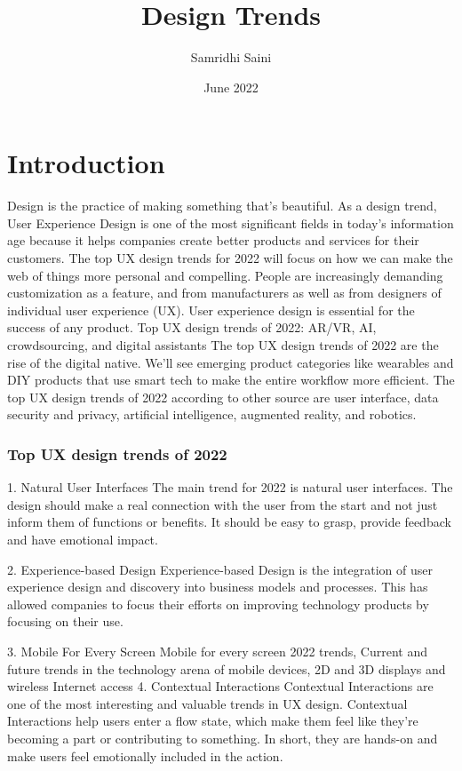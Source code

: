 \documentclass{article}
\title{Design Trends}
\author{Samridhi Saini}
\date{June 2022}
\begin{document}
\maketitle

\section{Introduction}
 Design is the practice of making something that’s beautiful. As a design trend, User Experience Design is one of the most significant fields in today’s information age because it helps companies create better products and services for their customers.
The top UX design trends for 2022 will focus on how we can make the web of things more personal and compelling. People are increasingly demanding customization as a feature, and from manufacturers as well as from designers of individual user experience (UX).
User experience design is essential for the success of any product. Top UX design trends of 2022: AR/VR, AI, crowdsourcing, and digital assistants
The top UX design trends of 2022 are the rise of the digital native. We'll see emerging product categories like wearables and DIY products that use smart tech to make the entire workflow more efficient. The top UX design trends of 2022 according to other source  are user interface, data security and privacy, artificial intelligence, augmented reality, and robotics.

\subsubsection{Top UX design trends of 2022}
1. Natural User Interfaces 
 The main trend for 2022 is natural user interfaces. The design should make a real connection with the user from the start and not just inform them of functions or benefits. It should be easy to grasp, provide feedback and have emotional impact.

2. Experience-based Design
 Experience-based Design is the integration of user experience design and discovery into business models and processes. This has allowed companies to focus their efforts on improving technology products by focusing on their use. 
 
3. Mobile For Every Screen 
 Mobile for every screen 2022 trends, Current and future trends in the technology arena of mobile devices, 2D and 3D displays and wireless Internet access
4. Contextual Interactions
Contextual Interactions are one of the most interesting and valuable trends in UX design. Contextual Interactions help users enter a flow state, which make them feel like they’re becoming a part or contributing to something. In short, they are hands-on and make users feel emotionally included in the action.
\end{document}
